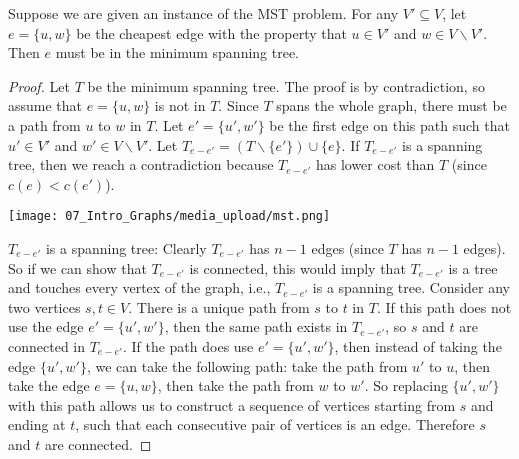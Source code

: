 \begin{flex}
\label{grp:theorem:MST-cut-property}

\begin{theorem}
\label{theorem:MST-cut-property} 
Suppose we are given an instance of the MST problem. For any $V' \subseteq V$, let $e = \{u,w\}$ be the cheapest edge with the property that $u \in V'$ and $w \in V\backslash V'$. Then $e$ must be in the minimum spanning tree.

\end{theorem}

\begin{proof}
\label{prf:intro-to-graph-theory::minimum}
Let $T$ be the minimum spanning tree. The proof is by contradiction, so assume that $e = \{u,w\}$ is not in $T$. Since $T$ spans the whole graph, there must be a path from $u$ to $w$ in $T$. Let $e' = \{u',w'\}$ be the first edge on this path such that $u' \in V'$ and $w' \in V \backslash V'$. Let $T_{e-e'} = (T \backslash \{e'\}) \cup \{e\}$. If $T_{e-e'}$ is a spanning tree, then we reach a contradiction because $T_{e-e'}$ has lower cost than $T$ (since $c(e) < c(e')$). 

\begin{center}
    \texttt{[image: 07\_Intro\_Graphs/media\_upload/mst.png]}
\end{center}

$T_{e-e'}$ is a spanning tree: Clearly $T_{e-e'}$ has $n-1$ edges (since $T$ has $n-1$ edges). So if we can show that $T_{e-e'}$ is connected, this would imply that $T_{e-e'}$ is a tree and touches every vertex of the graph, i.e., $T_{e-e'}$ is a spanning tree. Consider any two vertices $s,t \in V$. There is a unique path from $s$ to $t$ in $T$. If this path does not use the edge $e' = \{u',w'\}$, then the same path exists in $T_{e-e'}$, so $s$ and $t$ are connected in $T_{e-e'}$. If the path does use $e' = \{u',w'\}$, then instead of taking the edge $\{u',w'\}$, we can take the following path: take the path from $u'$ to $u$, then take the edge $e = \{u,w\}$, then take the path from $w$ to $w'$. So replacing $\{u',w'\}$ with this path allows us to construct a sequence of vertices starting from $s$ and ending at $t$, such that each consecutive pair of vertices is an edge. Therefore $s$ and $t$ are connected.

\end{proof}
\end{flex}

